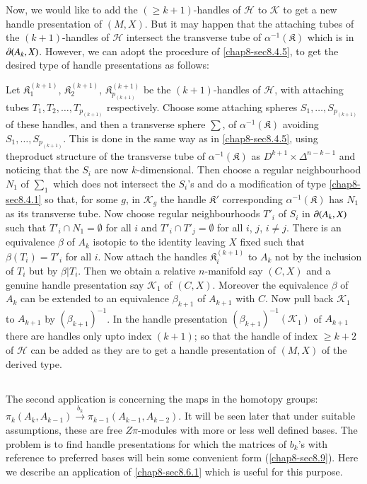 Now, we would like to add the $(\geq k+1)$-handles of $\mathscr{H}$ to $\mathscr{K}$ to get a new handle presentation of $(M,X)$. But it may happen that the attaching tubes of the $(k+1)$-handles of $\mathscr{H}$ intersect the transverse tube of $\alpha^{-1}(\mathfrak{K})$ which is in $\partial(A_{k},X)$. However, we can adopt the procedure of \ref{chap8-sec8.4.5}, to get the desired type of handle presentations as follows:

Let $\mathfrak{K}^{(k+1)}_{1}$, $\mathfrak{K}_{2}^{(k+1)}$, $\mathfrak{K}^{(k+1)}_{p_{(k+1)}}$ be the $(k+1)$-handles of $\mathscr{H}$, with attaching tubes $T_{1},T_{2},\ldots,T_{p_{(k+1)}}$ respectively. Choose some attaching spheres $S_{1},\ldots,S_{p_{(k+1)}}$ of these handles, and then a transverse sphere $\sum$, of $\alpha^{-1}(\mathfrak{K})$ avoiding $S_{1},\ldots,S_{p_{(k+1)}}$. This is done in the same way as in \ref{chap8-sec8.4.5}, using the\pageoriginale product structure of the transverse tube of $\alpha^{-1}(\mathfrak{K})$ as $D^{k+1}\times \Delta^{n-k-1}$ and noticing that the $S_{i}$ are now $k$-dimensional. Then choose a regular neighbourhood $N_{1}$ of $\sum_{1}$ which does not intersect the $S_{i}$'s and do a modification of type \ref{chap8-sec8.4.1} so that, for some $g$, in $\mathscr{K}_{g}$ the handle $\mathfrak{K}'$ corresponding $\alpha^{-1}(\mathfrak{K})$ has $N_{1}$ as its transverse tube. Now choose regular neighbourhoods $T'_{i}$ of $S_{i}$ in $\partial (A_{k},X)$ such that $T'_{i}\cap N_{1}=\emptyset$ for all $i$ and $T'_{i}
\cap T'_{j}=\emptyset$ for all $i$, $j$, $i\neq j$. There is an equivalence $\beta$ of $A_{k}$ isotopic to the identity leaving $X$ fixed such that $\beta(T_{i})=T'_{i}$ for all $i$. Now attach the handles $\mathfrak{K}^{(k+1)}_{i}$ to $A_{k}$ not by the inclusion of $T_{i}$ but by $\beta|T_{i}$. Then we obtain a relative $n$-manifold say $(C,X)$ and a genuine handle presentation say $\mathscr{K}_{1}$ of $(C,X)$. Moreover the equivalence $\beta$ of $A_{k}$ can be extended to an equivalence $\beta_{k+1}$ of $A_{k+1}$ with $C$. Now pull back $\mathscr{K}_{1}$ to $A_{k+1}$ by $(\beta_{k+1})^{-1}$. In the handle presentation $(\beta_{k+1})^{-1}
(\mathscr{K}_{1})$ of $A_{k+1}$ there are handles only upto index $(k+1)$; so that the handle of index $\geq k+2$ of $\mathscr{H}$ can be added as they are to get a handle presentation of $(M,X)$ of the derived type.

\setcounter{subsection}{2}
\subsection{}\label{chap8-sec8.6.3}
The second application is concerning the maps in the homotopy groups: $\pi_{k}(A_{k},A_{k-1})\xrightarrow{b_{k}}\pi_{k-1}(A_{k-1},A_{k-2})$. It will be seen later that under suitable assumptions, these are free $Z\pi$-modules with more or less well defined bases. The problem is to find handle presentations for which the matrices of $b_{k}$'s with reference to preferred bases will be\pageoriginale in some convenient form (\ref{chap8-sec8.9}). Here we describe an application of 
\ref{chap8-sec8.6.1} which is useful for this purpose.

